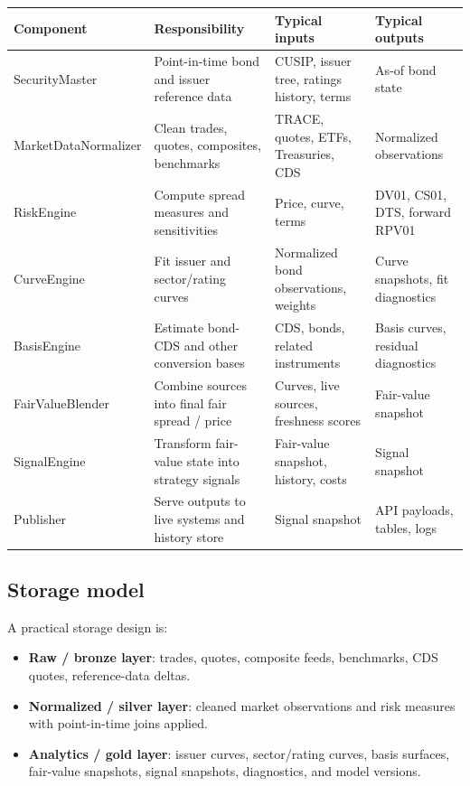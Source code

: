 \documentclass[11pt]{article}
\begin{document}
\small
\begin{longtable}{L{2.1cm}L{4.0cm}L{3.4cm}L{2.6cm}}
\textbf{\color{Accent}Component} &
\textbf{\color{Accent}Responsibility} &
\textbf{\color{Accent}Typical inputs} &
\textbf{\color{Accent}Typical outputs} \\
\toprule
\endhead

SecurityMaster &
Point-in-time bond and issuer reference data &
CUSIP, issuer tree, ratings history, terms &
As-of bond state \\

MarketDataNormalizer &
Clean trades, quotes, composites, benchmarks &
TRACE, quotes, ETFs, Treasuries, CDS &
Normalized observations \\

RiskEngine &
Compute spread measures and sensitivities &
Price, curve, terms &
DV01, CS01, DTS, forward RPV01 \\

CurveEngine &
Fit issuer and sector/rating curves &
Normalized bond observations, weights &
Curve snapshots, fit diagnostics \\

BasisEngine &
Estimate bond-CDS and other conversion bases &
CDS, bonds, related instruments &
Basis curves, residual diagnostics \\

FairValueBlender &
Combine sources into final fair spread / price &
Curves, live sources, freshness scores &
Fair-value snapshot \\

SignalEngine &
Transform fair-value state into strategy signals &
Fair-value snapshot, history, costs &
Signal snapshot \\

Publisher &
Serve outputs to live systems and history store &
Signal snapshot &
API payloads, tables, logs \\
\bottomrule
\end{longtable}
\normalsize

\subsection{Storage model}

A practical storage design is:

\begin{itemize}
    \item \textbf{Raw / bronze layer}: trades, quotes, composite feeds, benchmarks, CDS quotes, reference-data deltas.
    \item \textbf{Normalized / silver layer}: cleaned market observations and risk measures with point-in-time joins applied.
    \item \textbf{Analytics / gold layer}: issuer curves, sector/rating curves, basis surfaces, fair-value snapshots, signal snapshots, diagnostics, and model versions.
\end{itemize}
\end{document}
